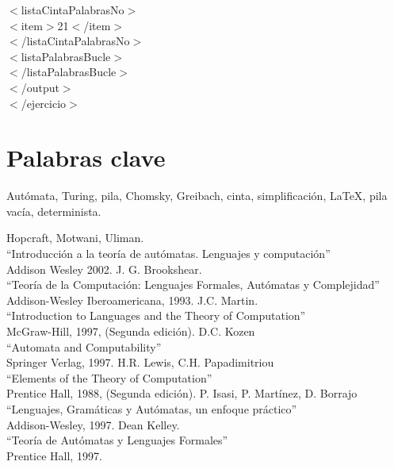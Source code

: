 \documentclass[12pt,a4paper,spanish]{book}
\newcommand{\clearemptydoublepage}{\newpage{\pagestyle{empty}
\cleardoublepage}}
\begin{document}
{\indent $<$listaCintaPalabrasNo$>$\\

\indent \indent $<$item$>$21$<$/item$>$\\

\indent $<$/listaCintaPalabrasNo$>$\\

$<$listaPalabrasBucle$>$\\

$<$/listaPalabrasBucle$>$\\

$<$/output$>$\\

$<$/ejercicio$>$\\

}

\clearemptydoublepage
\chapter{Palabras clave}
Aut\'omata, Turing, pila, Chomsky, Greibach, cinta, simplificaci\'on, \LaTeX{}, pila vac\'ia, determinista.

\begin{thebibliography}{XXX}
\bibitem{}Hopcraft, Motwani, Uliman.\\
``Introducci\'on a la teor\'ia de aut\'omatas. Lenguajes y computaci\'on''\\
Addison Wesley 2002.
\bibitem{}J. G. Brookshear.\\
``Teor\'ia de la Computaci\'on: Lenguajes Formales, Aut\'omatas y Complejidad''\\
Addison-Wesley Iberoamericana, 1993.
\bibitem{}J.C. Martin.\\
``Introduction to Languages and the Theory of Computation''\\
McGraw-Hill, 1997, (Segunda edici\'on).
\bibitem{}D.C. Kozen\\
``Automata and Computability''\\
Springer Verlag, 1997.
\bibitem{}H.R. Lewis, C.H. Papadimitriou\\
``Elements of the Theory of Computation''\\
Prentice Hall, 1988, (Segunda edici\'on).
\bibitem{}P. Isasi, P. Mart\'inez, D. Borrajo\\
``Lenguajes, Gram\'aticas y Aut\'omatas, un enfoque pr\'actico''\\
Addison-Wesley, 1997.
\bibitem{}Dean Kelley.\\
``Teor\'ia de Aut\'omatas y Lenguajes Formales''\\
Prentice Hall, 1997.
\bibitem{}
\end{thebibliography}
\end{document}
